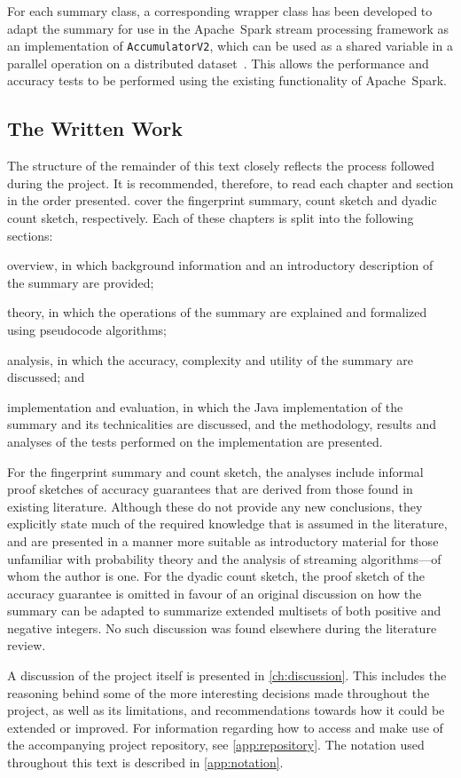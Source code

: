 For each summary class, a corresponding wrapper class has been developed to adapt the summary for use in the Apache~Spark stream processing framework as an implementation of \lstinline{AccumulatorV2}, which can be used as a shared variable in a parallel operation on a distributed dataset~\citep{tasf14}.
This allows the performance and accuracy tests to be performed using the existing functionality of Apache~Spark.

\subsection{The Written Work}
\label{subsec:introduction-structure-work}

The structure of the remainder of this text closely reflects the process followed during the project.
It is recommended, therefore, to read each chapter and section in the order presented.
 cover the fingerprint summary, count sketch and dyadic count sketch, respectively.
Each of these chapters is split into the following sections:
\begin{enumerate*}
  \item overview, in which background information and an introductory description of the summary are provided;
  \item theory, in which the operations of the summary are explained and formalized using pseudocode algorithms;
  \item analysis, in which the accuracy, complexity and utility of the summary are discussed; and
  \item implementation and evaluation, in which the Java implementation of the summary and its technicalities are discussed, and the methodology, results and analyses of the tests performed on the implementation are presented.
\end{enumerate*}

For the fingerprint summary and count sketch, the analyses include informal proof sketches of accuracy guarantees that are derived from those found in existing literature.
Although these do not provide any new conclusions, they explicitly state much of the required knowledge that is assumed in the literature, and are presented in a manner more suitable as introductory material for those unfamiliar with probability theory and the analysis of streaming algorithms---of whom the author is one.
For the dyadic count sketch, the proof sketch of the accuracy guarantee is omitted in favour of an original discussion on how the summary can be adapted to summarize extended multisets of both positive and negative integers.
No such discussion was found elsewhere during the literature review.

A discussion of the project itself is presented in \cref{ch:discussion}.
This includes the reasoning behind some of the more interesting decisions made throughout the project, as well as its limitations, and recommendations towards how it could be extended or improved.
For information regarding how to access and make use of the accompanying project repository, see \cref{app:repository}.
The notation used throughout this text is described in \cref{app:notation}.
